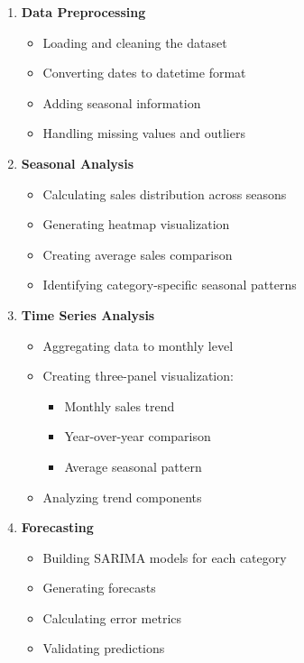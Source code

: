 \documentclass[11pt,a4paper]{article}
\begin{document}
\begin{enumerate}
    \item \textbf{Data Preprocessing}
    \begin{itemize}
        \item Loading and cleaning the dataset
        \item Converting dates to datetime format
        \item Adding seasonal information
        \item Handling missing values and outliers
    \end{itemize}

    \item \textbf{Seasonal Analysis}
    \begin{itemize}
        \item Calculating sales distribution across seasons
        \item Generating heatmap visualization
        \item Creating average sales comparison
        \item Identifying category-specific seasonal patterns
    \end{itemize}

    \item \textbf{Time Series Analysis}
    \begin{itemize}
        \item Aggregating data to monthly level
        \item Creating three-panel visualization:
            \begin{itemize}
                \item Monthly sales trend
                \item Year-over-year comparison
                \item Average seasonal pattern
            \end{itemize}
        \item Analyzing trend components
    \end{itemize}

    \item \textbf{Forecasting}
    \begin{itemize}
        \item Building SARIMA models for each category
        \item Generating forecasts
        \item Calculating error metrics
        \item Validating predictions
    \end{itemize}
\end{enumerate}
\end{document}
